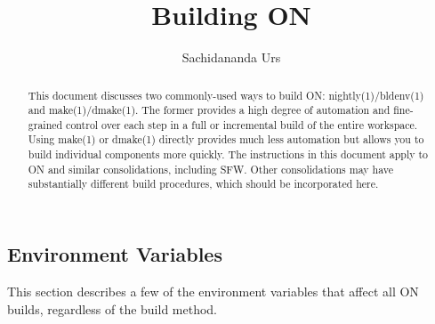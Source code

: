 \documentclass{article}
\title{Building ON}
\author{Sachidananda Urs}
\date{}
\begin{document}
\maketitle

\begin{abstract}
  This document discusses two commonly-used ways to build ON: \- nightly(1)/bldenv(1)
  and make(1)/dmake(1). The former provides a high degree of automation and
  fine-grained control over each step in a full or incremental build of the entire
  workspace. Using make(1) or dmake(1) directly provides much less automation but
  allows you to build individual components more quickly. The instructions in this
  document apply to ON and similar consolidations,  including SFW. Other
  consolidations may have substantially different build procedures, which should
  be incorporated here.
\end{abstract}

\subsection*{Environment Variables}

This section describes a few of the environment variables that affect all ON
builds, regardless of the build method.
\end{document}

